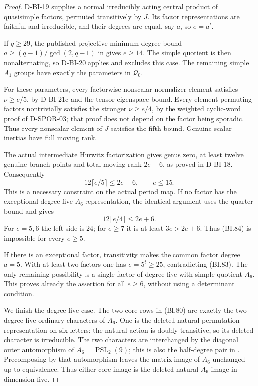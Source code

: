 \begin{proof}
D-BI-19 supplies a normal irreducibly acting central product of
quasisimple factors, permuted transitively by $J$.  Its factor
representations are faithful and irreducible, and their degrees
are equal, say $a$, so $e=a^t$.

If $q\ge29$, the published projective minimum-degree bound
$a\ge(q-1)/\gcd(2,q-1)$ in
\cite[Table~1, author p.~14]{BI:Hoffman} gives $e\ge14$.
The simple quotient is then nonalternating, so D-BI-20 applies
and excludes this case.  The remaining simple $A_1$ groups have
exactly the parameters in $\mathcal Q_0$.

For these parameters, every factorwise nonscalar normalizer
element satisfies $\nu\ge e/5$, by D-BI-21c and the tensor
eigenspace bound.  Every element permuting factors nontrivially
satisfies the stronger $\nu\ge e/4$, by the weighted cyclic-word
proof of D-SPOR-03; that proof does not depend on the factor
being sporadic.  Thus every nonscalar element of $J$ satisfies
the fifth bound.  Genuine scalar inertias have full moving rank.

The actual intermediate Hurwitz factorization gives genus zero,
at least twelve genuine branch points and total moving rank
$2e+6$, as proved in D-BI-18.  Consequently
\[
          12\lceil e/5\rceil\le2e+6,
          \qquad e\le15.                                  \tag{BI.83}
\]
This is a necessary constraint on the actual period map.
If no factor has the exceptional degree-five $A_6$ representation,
the identical argument uses the quarter bound and gives
\[
                         12\lceil e/4\rceil\le2e+6.
                                                               \tag{BI.84}
\]
For $e=5,6$ the left side is $24$; for $e\ge7$ it is at
least $3e>2e+6$.  Thus (BI.84) is impossible for every $e\ge5$.

If there is an exceptional factor, transitivity makes the common
factor degree $a=5$.  With at least two factors one has
$e=5^t\ge25$, contradicting (BI.83).  The only remaining
possibility is a single factor of degree five with simple quotient
$A_6$.  This proves already the assertion for all $e\ge6$,
without using a determinant condition.

We finish the degree-five case.  The two core rows in (BI.80)
are exactly the two degree-five ordinary characters of $A_6$.
One is the deleted natural permutation representation on six
letters: the natural action is doubly transitive, so its deleted
character is irreducible.  The two characters are interchanged
by the diagonal outer automorphism of
$A_6=\operatorname{PSL}_2(9)$; this is also the half-degree pair
in \cite[Lemma~4.4, p.~9]{BI:WhiteSL2}.  Precomposing by that
automorphism leaves the matrix image of $A_6$ unchanged up to
equivalence.  Thus either core image is the deleted natural
$A_6$ image in dimension five.


\end{proof}
